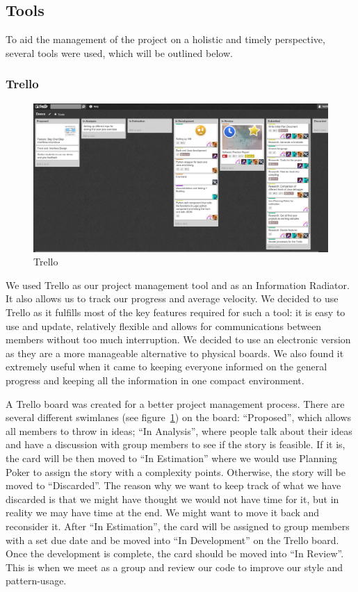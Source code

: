 \documentclass[11pt, a4paper]{article}
\begin{document}
\subsection{Tools}

To aid the management of the project on a holistic and timely perspective, several tools were used, which will be outlined below.

\subsubsection{Trello}
\begin{figure}[h!]
\centering
\includegraphics[width=\textwidth]{Trello.png}
\caption{Trello}
\label{fig:Trello}
\end{figure}

We used Trello as our project management tool and as an Information Radiator\cite{Trello}.
It also allows us to track our progress and average velocity.
We decided to use Trello as it fulfills most of the key features required for such a tool: it is easy to use and update, relatively flexible and allows for communications between members without too much interruption.
We decided to use an electronic version as they are a more manageable alternative to physical boards.
We also found it extremely useful when it came to keeping everyone informed on the general progress and keeping all the information in one compact environment.

A Trello board was created for a better project management process.
There are several different swimlanes (see figure~\ref{fig:Trello}) on the board: ``Proposed'', which allows all members to throw in ideas; ``In Analysis'', where people talk about their ideas and have a discussion with group members to see if the story is feasible.
If it is, the card will be then moved to ``In Estimation'' where we would use Planning Poker to assign the story with a complexity points.
Otherwise, the story will be moved to ``Discarded''.
The reason why we want to keep track of what we have discarded is that we might have thought we would not have time for it, but in reality we may have time at the end.
We might want to move it back and reconsider it.
After ``In Estimation'', the card will be assigned to group members with a set due date and be moved into ``In Development'' on the Trello board.
Once the development is complete, the card should be moved into ``In Review''.
This is when we meet as a group and review our code to improve our style and pattern-usage.
\end{document}
